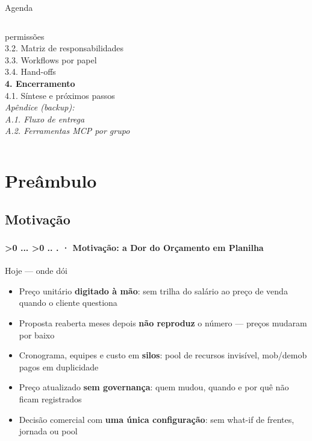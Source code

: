 \documentclass[aspectratio=169,10pt]{beamer}
\newcounter{mlc3}[subsection]
\newcounter{mlc4}[mlc3]
\newcommand{\pathnum}{%
  \ifnum\value{mlc4}>0
    \thesection.\thesubsection.\arabic{mlc3}.\arabic{mlc4}%
  \else\ifnum\value{mlc3}>0
    \thesection.\thesubsection.\arabic{mlc3}%
  \else
    \thesection.\thesubsection%
  \fi\fi
}
\newcommand{\mtitle}[1]{%
  \frametitle{\insertsection}%
  \framesubtitle{\pathnum\;·\; #1}}
\begin{document}
\begin{frame}{Agenda}
\begin{columns}[T]
{    \hspace*{10pt}permissões\\
    3.2. Matriz de responsabilidades\\
    3.3. Workflows por papel\\
    3.4. Hand-offs\\[12pt]}
    {\small\textbf{\textcolor{mlgreen}{4. Encerramento}}}\\[4pt]
    {\footnotesize
    4.1. Síntese e próximos passos\\[12pt]}
    {\footnotesize\itshape\textcolor{mlgray!40!black}{Apêndice (backup):\\
    A.1. Fluxo de entrega\\
    A.2. Ferramentas MCP por grupo}}
  \end{columns}
\end{frame}

\section{Preâmbulo}

\subsection{Motivação}
\begin{frame}
  \mtitle{Motivação: a Dor do Orçamento em Planilha}
  \centering
  \begin{minipage}{0.72\textwidth}
    \begin{alertblock}{Hoje --- onde dói}
      \begin{itemize}
        \item Preço unitário \textbf{digitado à mão}: sem trilha do
          salário ao preço de venda quando o cliente questiona
        \item Proposta reaberta meses depois \textbf{não reproduz} o
          número --- preços mudaram por baixo
        \item Cronograma, equipes e custo em \textbf{silos}: pool de
          recursos invisível, mob/demob pagos em duplicidade
        \item Preço atualizado \textbf{sem governança}: quem mudou,
          quando e por quê não ficam registrados
        \item Decisão comercial com \textbf{uma única configuração}:
          sem what-if de frentes, jornada ou pool
      \end{itemize}
    \end{alertblock}
  \end{minipage}
\end{frame}
\end{document}
